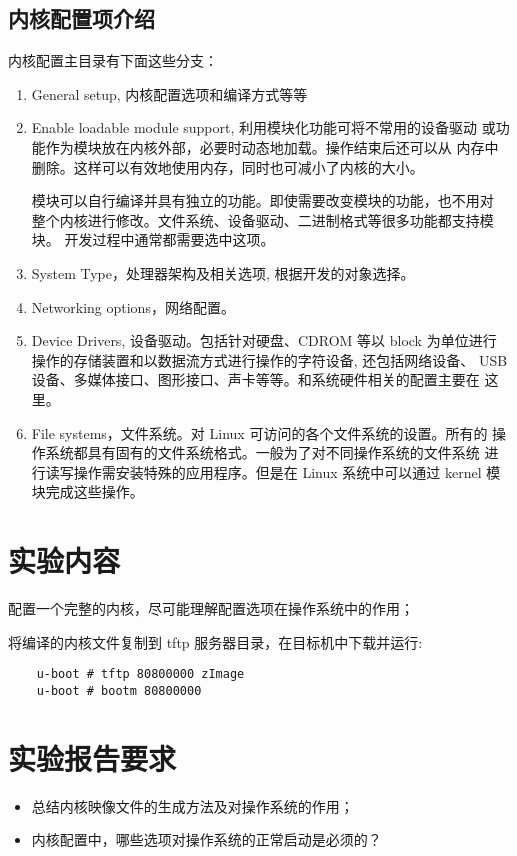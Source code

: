 \subsection{内核配置项介绍}
	内核配置主目录有下面这些分支：
\begin{enumerate}\itemsep=-3pt
  \item General setup, 内核配置选项和编译方式等等
  \item Enable loadable module support, 利用模块化功能可将不常用的设备驱动
		或功能作为模块放在内核外部，必要时动态地加载。操作结束后还可以从
		内存中删除。这样可以有效地使用内存，同时也可减小了内核的大小。

		模块可以自行编译并具有独立的功能。即使需要改变模块的功能，也不用对
		整个内核进行修改。文件系统、设备驱动、二进制格式等很多功能都支持模块。
		开发过程中通常都需要选中这项。
  \item System Type，处理器架构及相关选项, 根据开发的对象选择。
  \item Networking options，网络配置。
  \item Device Drivers, 设备驱动。包括针对硬盘、CDROM 等以 block 为单位进行
		操作的存储装置和以数据流方式进行操作的字符设备, 还包括网络设备、
		USB设备、多媒体接口、图形接口、声卡等等。和系统硬件相关的配置主要在
		这里。
  \item File systems，文件系统。对 Linux 可访问的各个文件系统的设置。所有的
		操作系统都具有固有的文件系统格式。一般为了对不同操作系统的文件系统
		进行读写操作需安装特殊的应用程序。但是在 Linux 系统中可以通过
		kernel 模块完成这些操作。
\end{enumerate}

\section{实验内容}
	配置一个完整的内核，尽可能理解配置选项在操作系统中的作用；

	将编译的内核文件复制到 tftp 服务器目录，在目标机中下载并运行:

\begin{boxedminipage}{.9\textwidth}
\begin{verbatim}
	u-boot # tftp 80800000 zImage
	u-boot # bootm 80800000
\end{verbatim}
\end{boxedminipage}

\section{实验报告要求}
\begin{itemize}\itemsep=-3pt
  \item 总结内核映像文件的生成方法及对操作系统的作用；
  \item 内核配置中，哪些选项对操作系统的正常启动是必须的？
\end{itemize}

